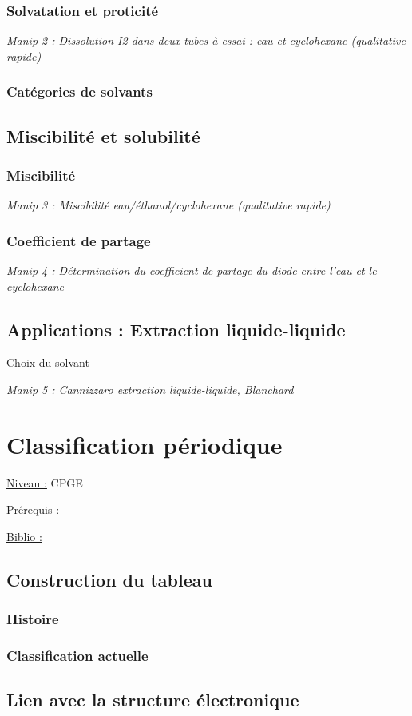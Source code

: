 \documentclass{article}%
\begin{document}
\subsubsection{Solvatation et proticité}
\textit{Manip 2 : Dissolution I2 dans deux tubes à essai : eau et cyclohexane (qualitative rapide)}
\subsubsection{Catégories de solvants}
\subsection{Miscibilité et solubilité}
\subsubsection{Miscibilité}
\textit{Manip 3 : Miscibilité eau/éthanol/cyclohexane (qualitative rapide)}
\subsubsection{Coefficient de partage}
\textit{Manip 4 : Détermination du coefficient de partage du diode entre l’eau et le cyclohexane}
\subsection{Applications : Extraction liquide-liquide}
Choix du solvant

\textit{Manip 5 : Cannizzaro extraction liquide-liquide, Blanchard}
\section{Classification périodique}
\underline{Niveau :} CPGE 

\underline{Prérequis :}

\underline{Biblio :} 
\subsection{Construction du tableau}
\subsubsection{Histoire}
\subsubsection{Classification actuelle}
\subsection{Lien avec la structure électronique}
\end{document}
